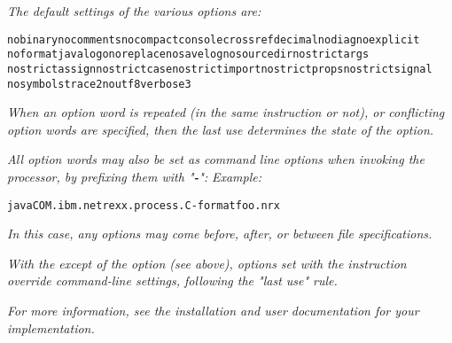 \emph{The default settings of the various options are:}
\begin{alltt}
nobinary nocomments nocompact console crossref decimal nodiag noexplicit
noformat java logo noreplace nosavelog nosourcedir nostrictargs
nostrictassign nostrictcase nostrictimport nostrictprops nostrictsignal
nosymbols trace2 noutf8 verbose3
\end{alltt}
 
\emph{When an option word is repeated (in the same 
instruction or not), or conflicting option words are specified, then the
last use determines the state of the option.}
 
\emph{All option words may also be set as command line options when invoking
the processor, by prefixing them with "\textbf{-}":}
 \emph{Example:}
\begin{alltt}
java COM.ibm.netrexx.process.\nr{}C -format foo.nrx
\end{alltt}
\emph{In this case, any options may come before, after, or between
file specifications.}
 
\emph{With the except of the  option (see above),
options set with the  instruction override command-line
settings, following the "last use" rule.}
 
\emph{For more information, see the installation and user documentation for
your implementation.
}
